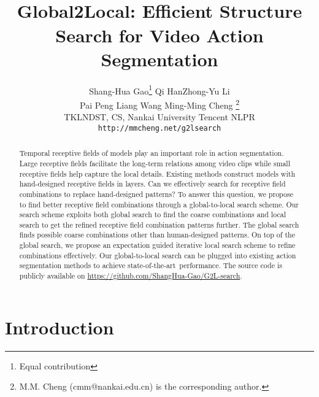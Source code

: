 \documentclass[final]{cvpr}
\newcommand{\sArt}{{state-of-the-art~}}
\newcommand*\samethanks[1][\value{footnote}]{\footnotemark[#1]}
\newcommand{\ConfInf}{\vspace{-.7in} {\normalsize \normalfont \color{blue}{
	IEEE International Conference on Computer Vision and Pattern Recognition (CVPR 2021)}} \vspace{.45in} \\}
\begin{document}
\title{\ConfInf Global2Local: Efficient Structure Search for Video Action Segmentation}

\author{Shang-Hua Gao\thanks{Equal contribution} \qquad Qi Han\samethanks \qquad Zhong-Yu Li \\
  \qquad Pai Peng \qquad Liang Wang \qquad Ming-Ming Cheng \thanks{M.M. Cheng (cmm@nankai.edu.cn) is the corresponding author.} \\
  TKLNDST, CS, Nankai University \qquad  Tencent \qquad NLPR\\
  {\tt\small http://mmcheng.net/g2lsearch}
}

\maketitle
\pagestyle{empty}  \thispagestyle{empty} \begin{abstract}
Temporal receptive fields of models play an important role in action segmentation.
Large receptive fields facilitate the long-term relations among video clips
while small receptive fields help capture the local details. 
Existing methods construct models with hand-designed receptive fields in layers.
Can we effectively search for receptive field combinations
to replace hand-designed patterns?
To answer this question, 
we propose to find better receptive field combinations 
through a global-to-local search scheme.
Our search scheme exploits both global search to find the coarse combinations 
and local search to
get the refined receptive field combination patterns further.
The global search finds possible coarse combinations 
other than human-designed patterns.
On top of the global search, 
we propose an expectation guided iterative local search scheme to 
refine combinations effectively. 
Our global-to-local search can be plugged into existing action segmentation
methods to achieve \sArt performance.
The source code is publicly available on \url{https://github.com/ShangHua-Gao/G2L-search}.
\end{abstract}


\section{Introduction}
\end{document}
